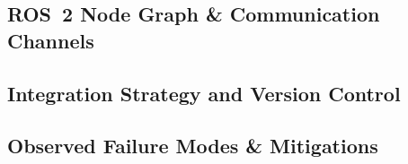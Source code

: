 \subsection{ROS 2 Node Graph \& Communication Channels}

\subsection{Integration Strategy and Version Control}

\subsection{Observed Failure Modes \& Mitigations}
